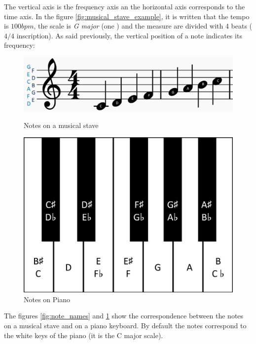 \documentclass[12pt]{report}
\begin{document}
The vertical axis is the frequency axis an the horizontal axis corresponds to the time axis.
In the figure \ref{fig:musical_stave_example}, it is written that the tempo is $100 bpm$, the scale is \textit{G major} (one \musSharp) and the measure are divided with 4 beats ($4/4$ inscription).
As said previously, the vertical position of a note indicates its frequency:

\begin{figure}[H]
   \begin{minipage}{0.5\textwidth}
     \centering
     \includegraphics[width=.9\linewidth]{images/music/stave/note_names.jpg}
     \caption{Notes on a musical stave}
     \label{fig:note_names}
   \end{minipage}\hfill
   \begin{minipage}{0.5\textwidth}
     \centering
     \includegraphics[width=.9\linewidth]{images/music/piano/piano_keys.jpg}
     \caption{Notes on Piano}
     \label{fig:piano_keys}
   \end{minipage}
\end{figure}

The figures \ref{fig:note_names} and \ref{fig:piano_keys} show the correspondence between the notes on a musical stave and on a piano keyboard. By default the notes correspond to the white keys of the piano (it is the C major scale).
\end{document}
